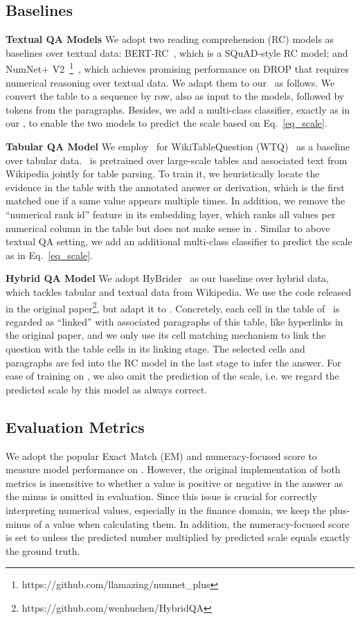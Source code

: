
\subsection{Baselines}
\label{sec:baselines}
\noindent \textbf{Textual QA Models}
We adopt two reading comprehension (RC) models as baselines over textual data: BERT-RC~\citep{Devlin2018Bert}, which is a SQuAD-style RC model;
and NumNet+ V2~\footnote{https://github.com/llamazing/numnet\_plus}~\citep{ran2019numnet}, which achieves promising performance on DROP that requires numerical reasoning over textual data.
We adapt them to our \finqa~as follows.
We convert the table to a sequence by row, also as input to the models, followed by tokens from the paragraphs. 
Besides, we add a multi-class classifier, exactly as in our \tagop, to enable the two models to predict the scale based on Eq.~\eqref{eq_scale}.

\noindent \textbf{Tabular QA Model}
We employ \tapas~for WikiTableQuestion (WTQ)~\citep{herzig2020tapas} as a baseline over tabular data.
\tapas~is pretrained over large-scale tables and associated text from Wikipedia jointly for table parsing.
To train it, we heuristically locate the evidence in the table with the annotated answer or derivation, which is the first matched one if a same value appears multiple times.
In addition, we remove the ``numerical rank id'' feature in its embedding layer, which ranks all values per numerical column in the table but does not make sense in \finqa. 
Similar to above textual QA setting, we add an additional multi-class classifier to predict the scale as in Eq.~\eqref{eq_scale}.

\noindent \textbf{Hybrid QA Model}
We adopt HyBrider~\citep{chen2020hybridqa} as our baseline over hybrid data, which tackles tabular and textual data from Wikipedia.
We use the code released in the original paper\footnote{https://github.com/wenhuchen/HybridQA}, but adapt it to \finqa. 
Concretely, each cell in the table of \finqa~is regarded as ``linked'' with associated paragraphs of this table, like hyperlinks in the original paper, and we only use its cell matching mechanism to link the question with the table cells in its linking stage.
The selected cells and paragraphs are fed into the RC model in the last stage to infer the answer.
For ease of training on \finqa, 
we also omit the prediction of the scale, i.e. 
we regard the predicted scale by this model as always correct.

\subsection{Evaluation Metrics}
We adopt the popular Exact Match (EM) and numeracy-focused \fone{} score \citep{Dua2019DROP} to measure model performance on \finqa. 
However, the original implementation of both metrics is insensitive to whether a value is positive or negative in the answer as the minus is omitted in evaluation.  
Since this issue is crucial for correctly interpreting numerical values, especially in the finance domain, we keep the plus-minus of a value when calculating them.
In addition, the numeracy-focused \fone{} score is set to  unless the predicted number multiplied by predicted scale equals exactly the ground truth.



